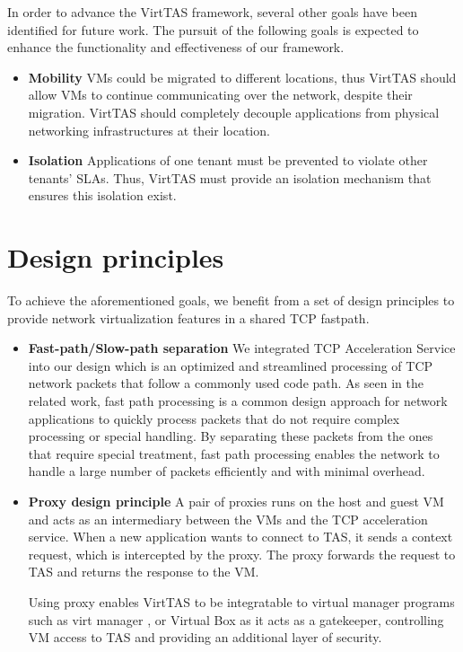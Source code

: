     In order to advance the VirtTAS framework, several other goals have been identified for 
    future work. The pursuit of the following goals is expected to enhance the functionality 
    and effectiveness of our framework. 
    
\begin{itemize}
    \item \textbf{Mobility} %
    VMs could be migrated to different locations, thus VirtTAS should allow VMs to continue 
    communicating over the network, despite their migration. VirtTAS should completely decouple applications 
    from physical networking infrastructures at their location.
    \item \textbf{Isolation} 
    Applications of one tenant must be prevented to violate other tenants' SLAs. 
    Thus, VirtTAS must provide 
    an isolation mechanism that ensures this isolation exist.

\end{itemize}

\section{Design principles}
To achieve the aforementioned goals, we benefit from a set of design principles 
to provide network virtualization features in a shared TCP fastpath.

\begin{itemize}
    \item \textbf{Fast-path/Slow-path separation} 
    We integrated TCP Acceleration Service into our design which is an optimized
     and streamlined processing of TCP network packets that 
    follow a commonly used code path. As seen in the related work, fast path processing is
    a common design approach for network applications to quickly process 
    packets that do not require complex processing or special handling. 
    By separating these packets from the ones that require special treatment, 
    fast path processing enables the network to handle a large number of packets 
    efficiently and with minimal overhead.

    \item \textbf{Proxy design principle}
    A pair of proxies runs on the host and guest VM and acts as an intermediary between 
    the VMs and the TCP acceleration service. When a new application wants to connect to 
    TAS, it sends a context request, which is intercepted by the proxy. The proxy forwards the 
    request to TAS and returns the response to the VM. 
    
    Using proxy enables VirtTAS to be integratable to virtual manager programs such as 
    virt manager \cite{virtmanager}, or Virtual Box \cite{virtualbox} as it acts as a gatekeeper,
    controlling VM access to TAS and providing an additional layer of security.


\end{itemize}

